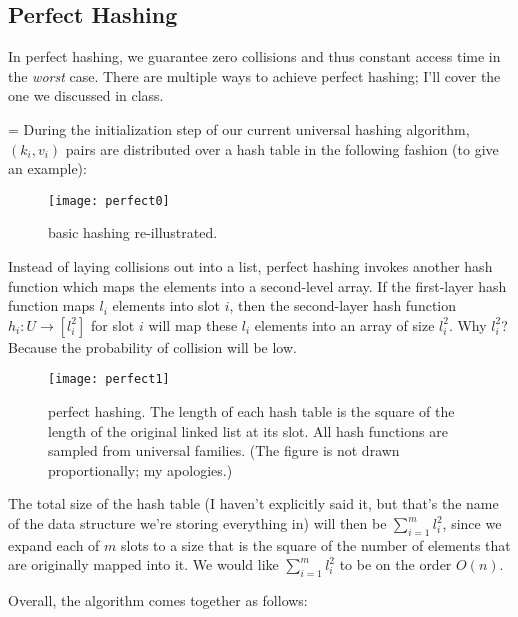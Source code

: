 \documentclass[11pt]{article}
\begin{document}
\subsection*{Perfect Hashing}

In perfect hashing, we guarantee zero collisions and thus constant access time in the \textit{worst} case. There are multiple ways to achieve perfect hashing; I'll cover the one we discussed in class.

{\parskip=\baselineskip
During the initialization step of our current universal hashing algorithm, $(k_i, v_i)$ pairs are distributed over a hash table in the following fashion (to give an example):

\begin{figure}[H]
\centering
\texttt{[image: perfect0]}
\caption{basic hashing re-illustrated.}
\end{figure}
\vspace*{-5mm}

Instead of laying collisions out into a list, perfect hashing invokes another hash function which maps the elements into a second-level array. If the first-layer hash function maps $l_i$ elements into slot $i$, then the second-layer hash function $h_i: U \to [l_i^2]$ for slot $i$ will map these $l_i$ elements into an array of size $l_i^2$. Why $l_i^2$? Because the probability of collision will be low.

\begin{figure}[H]
\centering
\texttt{[image: perfect1]}
\caption{perfect hashing. The length of each hash table is the square of the length of the original linked list at its slot. All hash functions are sampled from universal families. (The figure is not drawn proportionally; my apologies.)}
\end{figure}
\vspace*{-5mm}

The total size of the hash table (I haven't explicitly said it, but that's the name of the data structure we're storing everything in) will then be $\sum_{i = 1}^m l_i^2$, since we expand each of $m$ slots to a size that is the square of the number of elements that are originally mapped into it. We would like $\sum_{i = 1}^m l_i^2$ to be on the order $O(n)$.

Overall, the algorithm comes together as follows:

}
\end{document}
